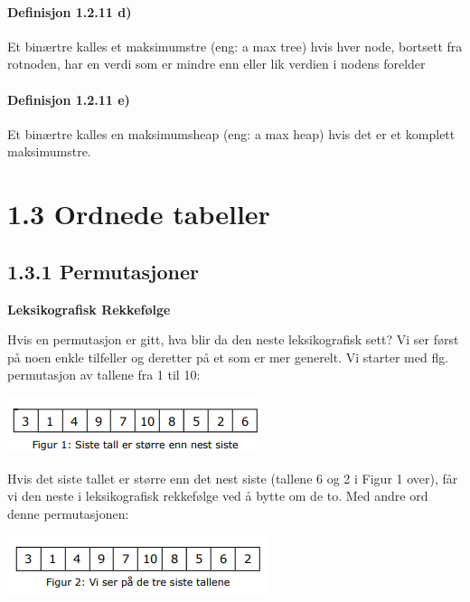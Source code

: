 \documentclass[11pt]{article}
\begin{document}
        \paragraph{Definisjon 1.2.11 d)} Et binærtre kalles et maksimumstre (eng: a max tree)
        hvis hver node, bortsett fra rotnoden, har en verdi som er mindre enn eller lik
        verdien i nodens forelder

        \paragraph{Definisjon 1.2.11 e)} Et binærtre kalles en maksimumsheap (eng: a max
        heap) hvis det er et komplett maksimumstre.


\section{1.3 Ordnede tabeller}

    \subsection{1.3.1 Permutasjoner}

        \textbf{Leksikografisk Rekkefølge}\\
        \begin{multicols}{2}
            Hvis en permutasjon er gitt, hva blir da den neste leksikografisk sett? Vi ser først
            på noen enkle tilfeller og deretter på et som er mer generelt. Vi starter med flg. permutasjon
            av tallene fra 1 til 10:

            \columnbreak
            
            \includegraphics[center]{f-1.3.1-1.png}
            
        \end{multicols}

        \begin{multicols}{2}
            Hvis det siste tallet er større enn det nest siste (tallene 6 og 2 i Figur 1 over), får vi den
            neste i leksikografisk rekkefølge ved å bytte om de to. Med andre ord denne permutasjonen:
            
            \columnbreak
            
            \includegraphics[center]{f-1.3.1-2.png}

        \end{multicols}
\end{document}
